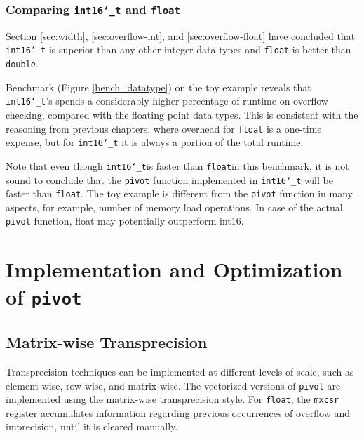 \documentclass[logo,bsc,singlespacing,parskip]{infthesis}
\newcommand{\dtshort}{\texttt{int16\char`_t}}
\newcommand{\dtfloat}{\texttt{float}}
\newcommand{\dtdouble}{\texttt{double}}
\newcommand{\mxcsr}{\texttt{mxcsr}}
\newcommand{\pivot}{\texttt{pivot}}
\begin{document}
\subsection{Comparing \dtshort{} and \dtfloat{}}

Section \ref{sec:width}, \ref{sec:overflow-int}, and \ref{sec:overflow-float}
have concluded that \dtshort{} is superior than any other integer data types and
\dtfloat{} is better than \dtdouble{}. 


Benchmark (Figure \ref{bench_datatype}) on the toy example reveals that
\dtshort{}'s spends a considerably higher percentage of runtime on overflow
checking, compared with the floating point data types. This is consistent with
the reasoning from previous chapters, where overhead for \dtfloat{} is a
one-time expense, but for \dtshort{} it is always a portion of the total
runtime. 

Note that even though \dtshort is faster than \dtfloat in this benchmark, it is
not sound to conclude that the \pivot{} function implemented in \dtshort
will be faster than \dtfloat. The toy example is different from the \pivot
function in many aspects, for example, number of memory load operations. In case
of the actual \pivot{} function, float may potentially outperform int16. 




\chapter{Implementation and Optimization of \pivot{}}

\section{Matrix-wise Transprecision}
Transprecision techniques can be implemented at different levels of scale, such
as element-wise, row-wise, and matrix-wise. The vectorized versions of \pivot{}
are implemented using the matrix-wise transprecision style. For \dtfloat{},
the \mxcsr{} register accumulates information regarding previous occurrences of
overflow and imprecision, until it is cleared manually. 
\end{document}
